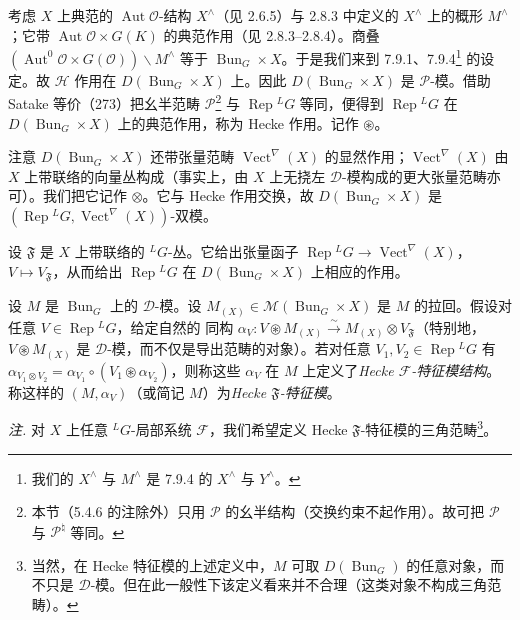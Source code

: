 考虑 $X$ 上典范的 $\operatorname{Aut}\mathcal{O}$-结构 $X^{\wedge}$（见 2.6.5）与 2.8.3 中定义的 $X^{\wedge}$ 上的概形 $M^{\wedge}$；它带 $\operatorname{Aut}\mathcal{O}\times G(K)$ 的典范作用（见 2.8.3–2.8.4）。商叠 $(\operatorname{Aut}^0\mathcal{O}\times G(\mathcal{O}))\backslash M^{\wedge}$ 等于 $\operatorname{Bun}_G\times X$。于是我们来到 7.9.1、7.9.4\footnote{我们的 $X^{\wedge}$ 与 $M^{\wedge}$ 是 7.9.4 的 $X^{\wedge}$ 与 $Y^{\wedge}$。} 的设定。故 $\mathcal{H}$ 作用在 $D(\operatorname{Bun}_G\times X)$ 上。因此 $D(\operatorname{Bun}_G\times X)$ 是 $\mathcal{P}$-模。借助 Satake 等价（273）把幺半范畴 $\mathcal{P}$\footnote{本节（5.4.6 的注除外）只用 $\mathcal{P}$ 的幺半结构（交换约束不起作用）。故可把 $\mathcal{P}$ 与 $\mathcal{P}^{\natural}$ 等同。} 与 $\operatorname{Rep}{}^{L}G$ 等同，便得到 $\operatorname{Rep}{}^{L}G$ 在 $D(\operatorname{Bun}_G\times X)$ 上的典范作用，称为 Hecke 作用。记作 $\circledast$。

注意 $D(\operatorname{Bun}_G\times X)$ 还带张量范畴 $\operatorname{Vect}^{\nabla}(X)$ 的显然作用；$\operatorname{Vect}^{\nabla}(X)$ 由 $X$ 上带联络的向量丛构成（事实上，由 $X$ 上无挠左 $\mathcal{D}$-模构成的更大张量范畴亦可）。我们把它记作 $\otimes$。它与 Hecke 作用交换，故 $D(\operatorname{Bun}_G\times X)$ 是 $(\operatorname{Rep}{}^{L}G,\operatorname{Vect}^{\nabla}(X))$-双模。

设 $\mathfrak{F}$ 是 $X$ 上带联络的 ${}^{L}G$-丛。它给出张量函子 $\operatorname{Rep}{}^{L}G\to\operatorname{Vect}^{\nabla}(X)$，$V\mapsto V_{\mathfrak{F}}$，从而给出 $\operatorname{Rep}{}^{L}G$ 在 $D(\operatorname{Bun}_G\times X)$ 上相应的作用。

 设 $M$ 是 $\operatorname{Bun}_G$ 上的 $\mathcal{D}$-模。设 $M_{(X)}\in\mathcal{M}(\operatorname{Bun}_G\times X)$ 是 $M$ 的拉回。假设对任意 $V\in\operatorname{Rep}{}^{L}G$，给定自然的
同构 $\alpha_V:V\circledast M_{(X)}\xrightarrow{\sim}M_{(X)}\otimes V_{\mathfrak{F}}$（特别地，$V\circledast M_{(X)}$ 是 $\mathcal{D}$-模，而不仅是导出范畴的对象）。若对任意 $V_1,V_2\in\operatorname{Rep}{}^{L}G$ 有 $\alpha_{V_1\otimes V_2}=\alpha_{V_1}\circ(V_1\circledast\alpha_{V_2})$，则称这些 $\alpha_V$ 在 $M$ 上定义了\emph{Hecke $\mathcal{F}$-特征模结构}。称这样的 $(M,\alpha_V)$（或简记 $M$）为\emph{Hecke $\mathfrak{F}$-特征模}。

\emph{注.} 对 $X$ 上任意 ${}^{L}G$-局部系统 $\mathcal{F}$，我们希望定义 Hecke $\mathfrak{F}$-特征模的三角范畴\footnote{当然，在 Hecke 特征模的上述定义中，$M$ 可取 $D(\operatorname{Bun}_G)$ 的任意对象，而不只是 $\mathcal{D}$-模。但在此一般性下该定义看来并不合理（这类对象不构成三角范畴）。}。

